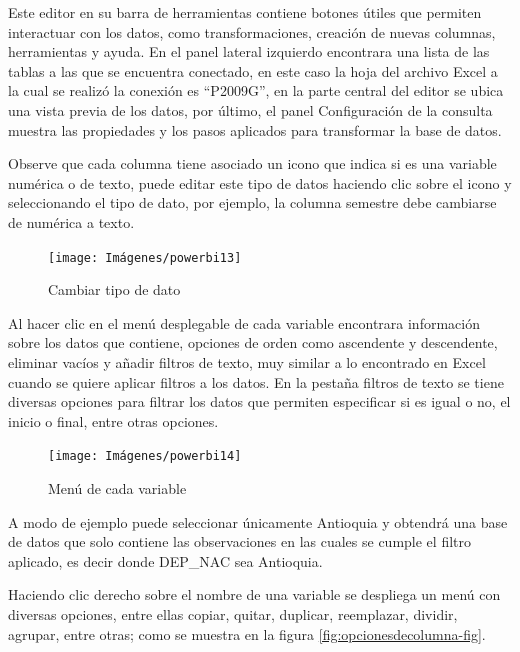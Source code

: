 \documentclass[
]{book}
\begin{document}
Este editor en su barra de herramientas contiene botones útiles que permiten interactuar con los datos, como transformaciones, creación de nuevas columnas, herramientas y ayuda. En el panel lateral izquierdo encontrara una lista de las tablas a las que se encuentra conectado, en este caso la hoja del archivo Excel a la cual se realizó la conexión es ``P2009G'', en la parte central del editor se ubica una vista previa de los datos, por último, el panel Configuración de la consulta muestra las propiedades y los pasos aplicados para transformar la base de datos.

Observe que cada columna tiene asociado un icono que indica si es una variable numérica o de texto, puede editar este tipo de datos haciendo clic sobre el icono y seleccionando el tipo de dato, por ejemplo, la columna semestre debe cambiarse de numérica a texto.

\begin{figure}

{\centering \texttt{[image: Imágenes/powerbi13]} 

}

\caption{Cambiar tipo de dato}\label{fig:cambiartipodato-fig}
\end{figure}

Al hacer clic en el menú desplegable de cada variable encontrara información sobre los datos que contiene, opciones de orden como ascendente y descendente, eliminar vacíos y añadir filtros de texto, muy similar a lo encontrado en Excel cuando se quiere aplicar filtros a los datos. En la pestaña filtros de texto se tiene diversas opciones para filtrar los datos que permiten especificar si es igual o no, el inicio o final, entre otras opciones.

\begin{figure}

{\centering \texttt{[image: Imágenes/powerbi14]} 

}

\caption{Menú de cada variable}\label{fig:opcionesfiltrado-fig}
\end{figure}

A modo de ejemplo puede seleccionar únicamente Antioquia y obtendrá una base de datos que solo contiene las observaciones en las cuales se cumple el filtro aplicado, es decir donde DEP\_NAC sea Antioquia.

Haciendo clic derecho sobre el nombre de una variable se despliega un menú con diversas opciones, entre ellas copiar, quitar, duplicar, reemplazar, dividir, agrupar, entre otras; como se muestra en la figura \ref{fig:opcionesdecolumna-fig}.
\end{document}
